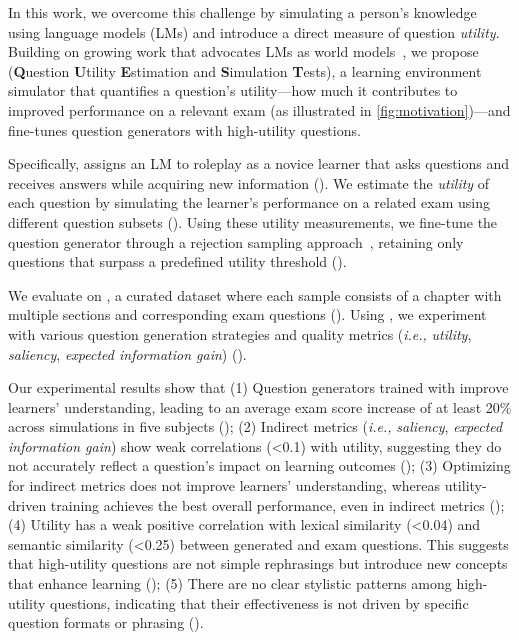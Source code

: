 In this work, we overcome this challenge by simulating a person's knowledge using language models (LMs) and introduce a direct measure of question \textit{utility}. 
Building on growing work that advocates LMs as world models~\cite{park2024generative, zhang2024simulating, he2024evaluating, jin2024agentreview, lu2024newsinterviewdatasetplaygroundevaluate, schmidgall2024agentclinic, zhaocompeteai}, we propose \ours (\textbf{Q}uestion \textbf{U}tility \textbf{E}stimation and \textbf{S}imulation \textbf{T}ests), a learning environment simulator that quantifies a question's utility---how much it contributes to improved performance on a relevant exam (as illustrated in \autoref{fig:motivation})---and fine-tunes question generators with high-utility questions.    

Specifically, \ours assigns an LM to roleplay as a novice learner that asks questions and receives answers while acquiring new information (). 
We estimate the \textit{utility} of each question by simulating the learner's performance on a related exam using different question subsets ().
Using these utility measurements, we fine-tune the question generator through a rejection sampling approach~\cite{bai2022constitutional}, retaining only questions that surpass a predefined utility threshold ().

We evaluate \ours on \ourdata, a curated dataset where each sample consists of a chapter with multiple sections and corresponding exam questions ().
Using \ourdata, we experiment with various question generation strategies and quality metrics (\textit{i.e.,} \textit{utility}, \textit{saliency}, \textit{expected information gain}) ().

Our experimental results show that
(1) Question generators trained with \ours improve learners' understanding, leading to an average exam score increase of at least 20\% across simulations in five subjects ();
(2) Indirect metrics (\textit{i.e.,} \textit{saliency}, \textit{expected information gain}) show weak correlations (<0.1) with utility, suggesting they do not accurately reflect a question’s impact on learning outcomes ();
(3) Optimizing for indirect metrics does not improve learners' understanding, whereas utility-driven training achieves the best overall performance, even in indirect metrics ();
(4) Utility has a weak positive correlation with lexical similarity (<0.04) and semantic similarity (<0.25) between generated and exam questions. This suggests that high-utility questions are not simple rephrasings but introduce new concepts that enhance learning ();
(5) There are no clear stylistic patterns among high-utility questions, indicating that their effectiveness is not driven by specific question formats or phrasing ().

